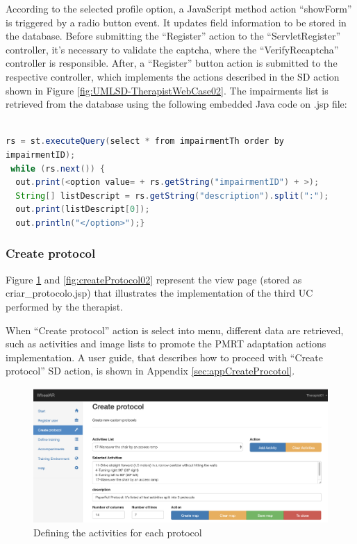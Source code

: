 According to the selected profile option, a JavaScript method action ``showForm'' is triggered by a radio button event. It updates field information to be stored in the database. Before submitting the  ``Register'' action to the ``ServletRegister'' controller, it's necessary to validate the captcha, where the ``VerifyRecaptcha'' controller is responsible. After, a ``Register'' button action is submitted to the respective controller, which implements the actions described in the SD action shown in Figure \ref{fig:UMLSD-TherapistWebCase02}.  The impairments list is retrieved from the database using the following embedded Java code on .jsp file:
\newline
\begin{lstlisting}[frame=single,language=Java]  % Start your code-block

rs = st.executeQuery(select * from impairmentTh order by 
impairmentID);
 while (rs.next()) {
  out.print(<option value= + rs.getString("impairmentID") + >);
  String[] listDescript = rs.getString("description").split(":");
  out.print(listDescript[0]);
  out.println("</option>");}
\end{lstlisting}


\subsubsection{Create protocol}
\label{sec:createProtocol}

Figure \ref{fig:createProtocol01} and \ref{fig:createProtocol02} represent the view page (stored as criar\_protocolo.jsp) that  illustrates the implementation of the third UC performed by the therapist. 

When ``Create protocol'' action is select into menu, different data are retrieved, such as activities and image lists to promote the PMRT adaptation actions implementation. A user guide, that describes how to proceed with ``Create protocol'' SD action, is shown in Appendix \ref{sec:appCreateProcotol}.

\begin{figure}[!hbt]
\begin{center}
\includegraphics[width=1\linewidth]{img/cap5/tCreateProtocol01}
\caption{Defining the activities for each protocol} \label{fig:createProtocol01}
\end{center}
\vspace{-10pt}
\end{figure}

